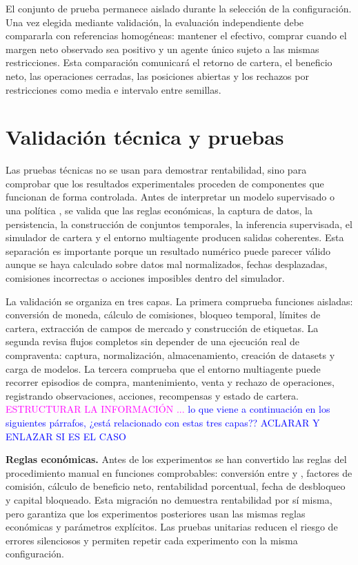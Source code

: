 El conjunto de prueba permanece aislado durante la selección de la configuración. Una vez elegida mediante validación, la evaluación independiente debe compararla con referencias homogéneas: mantener el efectivo, comprar cuando el margen neto observado sea positivo y un agente único sujeto a las mismas restricciones. Esta comparación comunicará el retorno de cartera, el beneficio neto, las operaciones cerradas, las posiciones abiertas y los rechazos por restricciones como media e intervalo entre semillas.

\section{Validación técnica y pruebas}
\label{sec:validacion-tecnica}

Las pruebas técnicas no se usan para demostrar rentabilidad, sino para comprobar que los resultados experimentales proceden de componentes que funcionan de forma controlada. Antes de interpretar un modelo supervisado o una política , se valida que las reglas económicas, la captura de datos, la persistencia, la construcción de conjuntos temporales, la inferencia supervisada, el simulador de cartera y el entorno multiagente producen salidas coherentes. Esta separación es importante porque un resultado numérico puede parecer válido aunque se haya calculado sobre datos mal normalizados, fechas desplazadas, comisiones incorrectas o acciones imposibles dentro del simulador.

La validación se organiza en tres capas. La primera comprueba funciones aisladas: conversión de moneda, cálculo de comisiones, bloqueo temporal, límites de cartera, extracción de campos de mercado y construcción de etiquetas. La segunda revisa flujos completos sin depender de una ejecución real de compraventa: captura, normalización, almacenamiento, creación de datasets y carga de modelos. La tercera comprueba que el entorno multiagente puede recorrer episodios de compra, mantenimiento, venta y rechazo de operaciones, registrando observaciones, acciones, recompensas y estado de cartera. \textcolor{magenta}{ESTRUCTURAR LA INFORMACIÓN ...} \textcolor{blue}{lo que viene a continuación en los siguientes párrafos, ¿está relacionado con estas tres capas?? ACLARAR Y ENLAZAR SI ES EL CASO}

\textbf{Reglas económicas.} Antes de los experimentos se han convertido las reglas del procedimiento manual en funciones comprobables: conversión entre  y , factores de comisión, cálculo de beneficio neto, rentabilidad porcentual, fecha de desbloqueo y capital bloqueado. Esta migración no demuestra rentabilidad por sí misma, pero garantiza que los experimentos posteriores usan las mismas reglas económicas y parámetros explícitos. Las pruebas unitarias reducen el riesgo de errores silenciosos y permiten repetir cada experimento con la misma configuración.

